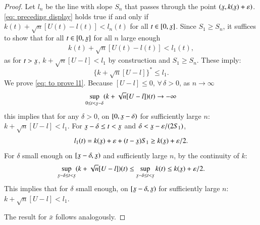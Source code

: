 \begin{proof}
Let $l_n$ be the line with slope $S_n$ that passes through the point $(\ubar{x}, k(\ubar{x})+\varepsilon)$. \eqref{eq: preceding display} holds true if and only if $k(t)+\sqrt{n}[U(t)-l(t)]<l_n(t)$ for all $t \in[0, \ubar{x}]$. Since $S_1 \geq S_n$, it suffices to show that for all $t \in[0, \ubar{x}]$ for all $n$ large enough
\begin{align}\label{eq: to prove l1}
k(t)+\sqrt{n}[U(t)-l(t)]<l_1(t),
\end{align}
as for $t > \ubar{x}$,  $k + \sqrt{n}[U-l] < l_1$ by construction and $S_1 \geq S_n$. These imply:
$$ \{ k + \sqrt{n}[U-l] \}^* \leq l_1.$$
We prove \eqref{eq: to prove l1}. Because $[U-l] \leq 0$, $\forall \, \delta >0$, as $n \rightarrow \infty$
$$ \sup_{0 \leq t < \ubar{x}-\delta} (k + \sqrt{n}[U-l])(t) \rightarrow - \infty$$
this implies that for any $\delta>0$, on $[0,\ubar{x}-\delta)$ for sufficiently large $n$:
$k + \sqrt{n}[U-l] < l_1$. For $\ubar{x}-\delta \leq t < \ubar{x}$ and $\delta < \ubar{x} - \varepsilon /(2 S_1)$, 
$$l_1(t) = k(\ubar{x}) + \varepsilon + (t- \ubar{x})S_1 \geq k(\ubar{x}) + \varepsilon/2.$$  
For $\delta$ small enough on $[\ubar{x}-\delta,\ubar{x})$ and sufficiently large $n$, by the continuity of $k$:
\begin{align*}
    \sup_{\ubar{x}-\delta \leq t < \ubar{x}} (k + \sqrt{n}[U-l])(t) \leq \sup_{\ubar{x}-\delta \leq t < \ubar{x}} k(t) \leq k(\ubar{x}) + \varepsilon/2.
\end{align*}
This implies that for $\delta$ small enough, on $[\ubar{x}-\delta,\ubar{x})$ for sufficiently large $n$: $k + \sqrt{n}[U-l] < l_1$. 

The result for $\bar{x}$ follows analogously.
\end{proof}

